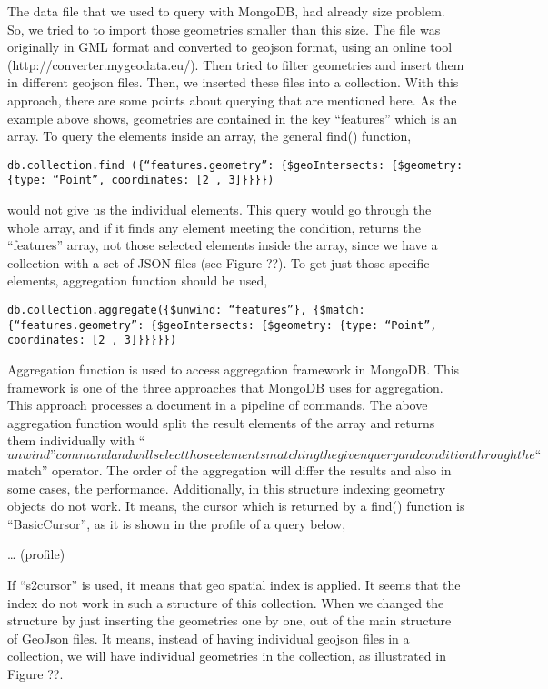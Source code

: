 The data file that we used to query with MongoDB, had already size problem. So, we tried to to import those geometries smaller than this size. The file was originally in GML format and converted to geojson format, using an online tool (http://converter.mygeodata.eu/). Then tried to filter geometries and insert them in different geojson files. Then, we inserted these files into a collection. With this approach, there are some points about querying that are mentioned here. As the example above shows, geometries are contained in the key “features” which is an array. To  query the elements inside an array, the general find() function,
\begin{verbatim}
db.collection.find ({“features.geometry”: {$geoIntersects: {$geometry: {type: “Point”, coordinates: [2 , 3]}}}})
\end{verbatim}
would not give us the individual elements. This query would go through the whole array, and if it finds any element meeting the condition, returns the “features” array, not those selected elements inside the array, since we have a collection with a set of JSON files (see Figure ??). To get just those specific elements, aggregation function should be used,
\begin{verbatim}
db.collection.aggregate({$unwind: “features”}, {$match: {“features.geometry”: {$geoIntersects: {$geometry: {type: “Point”, coordinates: [2 , 3]}}}}})
\end{verbatim}
Aggregation function is used to access aggregation framework in MongoDB. This framework is one of the three approaches that MongoDB uses for aggregation. This approach processes a document in a pipeline of commands. The above aggregation function would split the result elements of the array and returns them individually with “$unwind” command and will select those elements matching the given query and condition through the “$match” operator. The order of the aggregation will differ the results and also in some cases, the performance.
Additionally, in this structure indexing geometry objects do not work. It means, the cursor which is returned by a find() function is “BasicCursor”, as it is shown in the profile of a query below,

… (profile)

If “s2cursor” is used, it means that geo spatial index is applied. It seems that the index do not work in such a structure of this collection. When we changed the structure by just inserting the geometries one by one, out of the main structure of GeoJson files. It means, instead of having individual geojson files in a collection, we will have individual geometries in the collection, as illustrated in Figure ??.


